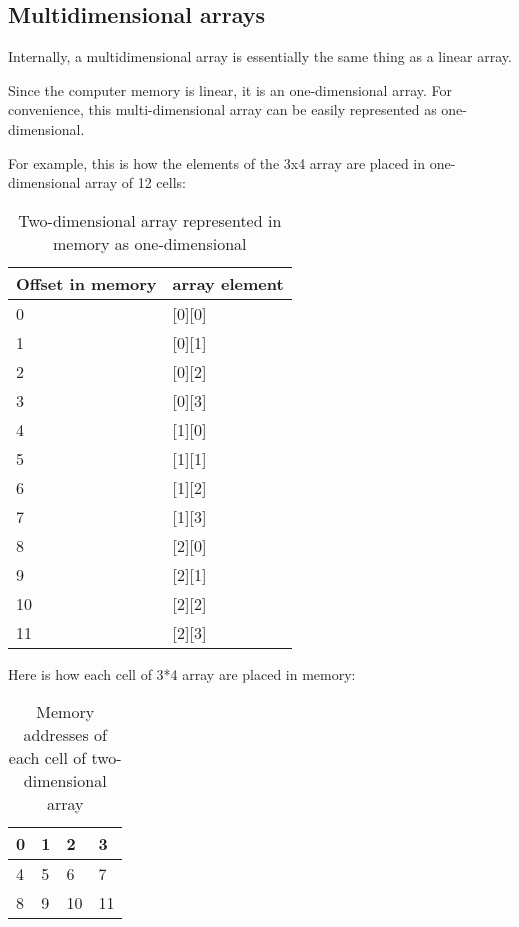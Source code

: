 \subsection{Multidimensional arrays}

Internally, a multidimensional array is essentially the same thing as a linear array.

Since the computer memory is linear, it is an one-dimensional array.
For convenience, this multi-dimensional array can be easily represented as one-dimensional.

For example, this is how the elements of the 3x4 array are placed in one-dimensional array of 12 cells:

\begin{table}[H]
\centering
\begin{tabular}{ | l | l | }
\hline
Offset in memory & array element \\
\hline
0 & [0][0] \\
\hline
1 & [0][1] \\
\hline
2 & [0][2] \\
\hline
3 & [0][3] \\
\hline
4 & [1][0] \\
\hline
5 & [1][1] \\
\hline
6 & [1][2] \\
\hline
7 & [1][3] \\
\hline
8 & [2][0] \\
\hline
9 & [2][1] \\
\hline
10 & [2][2] \\
\hline
11 & [2][3] \\
\hline
\end{tabular}
\caption{Two-dimensional array represented in memory as one-dimensional}
\end{table}

Here is how each cell of 3*4 array are placed in memory:

\begin{table}[H]
\centering
\begin{tabular}{ | l | l | l | l | }
\hline                        
0 & 1 & 2 & 3 \\
\hline  
4 & 5 & 6 & 7 \\
\hline  
8 & 9 & 10 & 11 \\
\hline  
\end{tabular}
\caption{Memory addresses of each cell of two-dimensional array}
\end{table}

